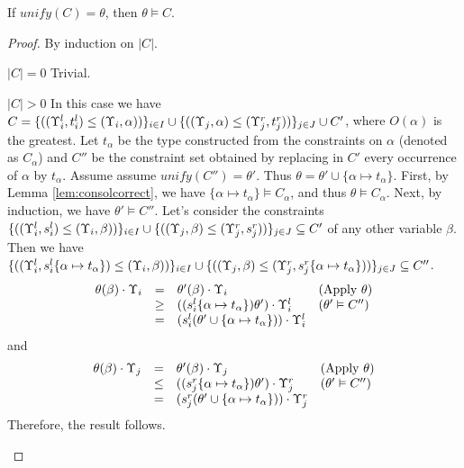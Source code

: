 {{{\begin{lemma}\label{lem:unifysound}
If $unify(C) = \theta$, then $\theta \vDash C$.
\end{lemma}
\begin{proof}
By induction on $|C|$.
\begin{ProofEnumDesc}
\item[$|C| = 0$] Trivial.
\item[$|C| > 0$] In this case we have $C = \{((\Upsilon_i^l,t_i^l)\leq(\Upsilon_i,\alpha))\}_{i\in I} \cup \{((\Upsilon_j,\alpha)\leq(\Upsilon_j^r,t_j^r))\}_{j\in J}\cup C'$, where $O(\alpha)$ is the greatest. Let $t_\alpha$ be the type constructed from the constraints on $\alpha$ (denoted as $C_{\alpha}$)  and $C''$ be the constraint set obtained by replacing in $C'$ every occurrence of $\alpha$ by $t_{\alpha}$.
Assume assume $unify(C'') = \theta'$. Thus $\theta = \theta'\cup\{\alpha\mapsto t_\alpha\}$.
First, by Lemma \ref{lem:consolcorrect}, we have $\{\alpha \mapsto t_\alpha\} \vDash C_{\alpha}$, and thus $\theta \vDash C_{\alpha}$.
Next, by induction, we have $\theta' \vDash C''$.
Let's consider the constraints $\{((\Upsilon_i^l,s_i^l)\leq(\Upsilon_i,\beta))\}_{i\in I} \cup \{((\Upsilon_j,\beta)\leq(\Upsilon_j^r,s_j^r))\}_{j\in J}\subseteq C'$ of any other variable $\beta$. Then we have $\{((\Upsilon_i^l,s_i^l\{\alpha\mapsto t_\alpha\})\leq(\Upsilon_i,\beta))\}_{i\in I} \cup \{((\Upsilon_j,\beta)\leq(\Upsilon_j^r,s_j^r\{\alpha\mapsto t_\alpha\}))\}_{j\in J}\subseteq C''$.
$$
\begin{array}{rlll}
\theta(\beta)\cdot\Upsilon_i &=&\theta'(\beta)\cdot\Upsilon_i &(\text{Apply } \theta) \\
&\geq&((s_i^l\{\alpha\mapsto t_\alpha\})\theta')\cdot\Upsilon_i^l & (\theta'\vDash C'')\\
& = &(s_i^l(\theta' \cup \{\alpha\mapsto t_\alpha\}))\cdot\Upsilon_i^l& \\
\end{array}
$$
and
$$
\begin{array}{rlll}
\theta(\beta)\cdot\Upsilon_j &=&\theta'(\beta)\cdot\Upsilon_j &(\text{Apply } \theta) \\
&\leq&((s_j^r\{\alpha\mapsto t_\alpha\})\theta')\cdot\Upsilon_j^r & (\theta'\vDash C'')\\
& = &(s_j^r(\theta' \cup \{\alpha\mapsto t_\alpha\}))\cdot\Upsilon_j^r& \\
\end{array}
$$
Therefore, the result follows.
\end{ProofEnumDesc}
\end{proof}

}}}

